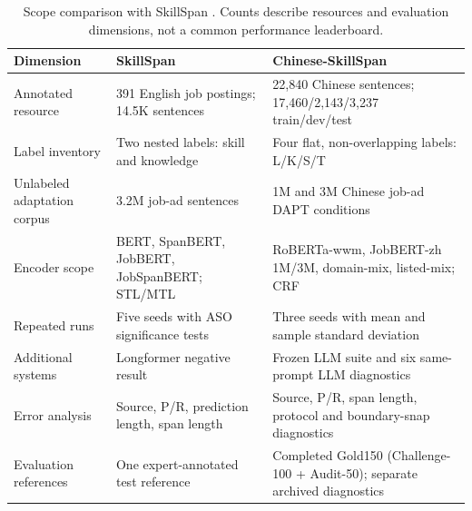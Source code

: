\begin{table}[htbp]
\caption{Scope comparison with SkillSpan \citep{zhang2022skillspan}. Counts describe resources and evaluation dimensions, not a common performance leaderboard.}
\label{tab:workload-skillspan}
\centering
\small
\begin{tabularx}{\textwidth}{@{}P{0.22\textwidth}P{0.30\textwidth}L@{}}
\toprule
\textbf{Dimension} & \textbf{SkillSpan} & \textbf{Chinese-SkillSpan} \\
\midrule
Annotated resource & 391 English job postings; 14.5K sentences & 22,840 Chinese sentences; 17,460/2,143/3,237 train/dev/test \\
Label inventory & Two nested labels: skill and knowledge & Four flat, non-overlapping labels: L/K/S/T \\
Unlabeled adaptation corpus & 3.2M job-ad sentences & 1M and 3M Chinese job-ad DAPT conditions \\
Encoder scope & BERT, SpanBERT, JobBERT, JobSpanBERT; STL/MTL & RoBERTa-wwm, JobBERT-zh 1M/3M, domain-mix, listed-mix; CRF \\
Repeated runs & Five seeds with ASO significance tests & Three seeds with mean and sample standard deviation \\
Additional systems & Longformer negative result & Frozen LLM suite and six same-prompt LLM diagnostics \\
Error analysis & Source, P/R, prediction length, span length & Source, P/R, span length, protocol and boundary-snap diagnostics \\
Evaluation references & One expert-annotated test reference & Completed Gold150 (Challenge-100 + Audit-50); separate archived diagnostics \\
\bottomrule
\end{tabularx}
\end{table}
